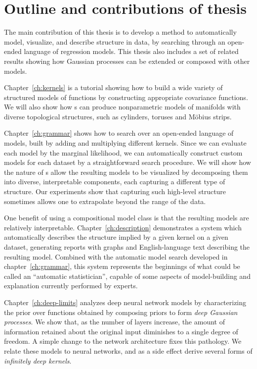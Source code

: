 \section{Outline and contributions of thesis}

The main contribution of this thesis is to develop a method to automatically model, visualize, and describe structure in data, by searching through an open-ended language of regression models.
This thesis also includes a set of related results showing how Gaussian processes can be extended or composed with other models.

Chapter~\ref{ch:kernels} is a tutorial showing how to build a wide variety of structured models of functions by constructing appropriate covariance functions.
We will also show how \gp{}s can produce nonparametric models of manifolds with diverse topological structures, such as cylinders, toruses and M\"obius strips.

Chapter~\ref{ch:grammar} shows how to search over an open-ended language of models, built by adding and multiplying different kernels.
Since we can evaluate each model by the marginal likelihood, we can automatically construct custom models for each dataset by a straightforward search procedure.
We will show how the nature of \gp{}s allow the resulting models to be visualized by decomposing them into diverse, interpretable components, each capturing a different type of structure.
Our experiments show that capturing such high-level structure sometimes allows one to extrapolate beyond the range of the data.

One benefit of using a compositional model class is that the resulting models are relatively interpretable.
Chapter~\ref{ch:description} demonstrates a system which automatically describes the structure implied by a given kernel on a given dataset, generating reports with graphs and English-language text describing the resulting model.
Combined with the automatic model search developed in chapter~\ref{ch:grammar}, this system represents the beginnings of what could be called an ``automatic statistician'', capable of some aspects of model-building and explanation currently performed by experts.

Chapter~\ref{ch:deep-limits} analyzes deep neural network models by characterizing the prior over functions obtained by composing \gp{} priors to form \emph{deep Gaussian processes}.
We show that, as the number of layers increase, the amount of information retained about the original input diminishes to a single degree of freedom.
A simple change to the network architecture fixes this pathology.
We relate these models to neural networks, and as a side effect derive several forms of \emph{infinitely deep kernels}.

